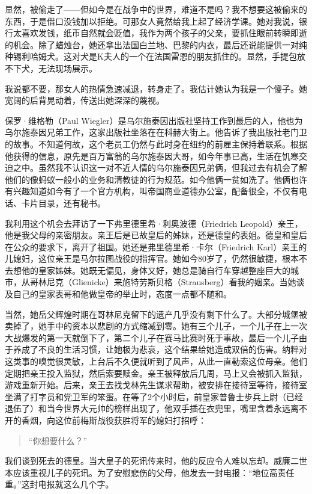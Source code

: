 \documentclass[UTF8]{ctexart}
\begin{document}
显然，被偷走了——但如今是在战争中的世界，难道不是吗？我不想要这被偷来的东西，于是借口没钱加以拒绝。可那女人竟然给我上起了经济学课。她对我说，银行太喜欢发钱，纸币自然就会贬值，我作为两个孩子的父亲，要抓住眼前转瞬即逝的机会。除了蜡烛台，她还拿出法国白兰地、巴黎的内衣，最后还说能提供一对纯种锡利哈姆犬。这对犬是K夫人的一个在法国雷恩的朋友抓住的。显然，手提包放不下犬，无法现场展示。

我说都不要，那女人的热情急速减退，转身走了。我估计她认为我是一个傻子。她宽阔的后背晃动着，传送出她深深的蔑视。

保罗·维格勒（Paul Wiegler）是乌尔施泰因出版社坚持工作到最后的人，他也为乌尔施泰因兄弟工作，这家出版社坐落在在科赫大街上。他告诉了我出版社老门卫的故事。不知道何故，这个老员工仍然与此时身在纽约的前雇主保持着联系。根据他获得的信息，原先是百万富翁的乌尔施泰因大哥，如今年事已高，生活在饥寒交迫之中。虽然我不认识这一对不近人情的乌尔施泰因兄弟俩，但我过去有机会了解他们的像蚂蚁一般小的业务和清教徒的行为规范。如今他俩一贫如洗了。他俩也许有兴趣知道如今有了一个官方机构，叫帝国商业道德办公室，配备很全，不仅有电话、卡片目录，还有秘书。

我利用这个机会去拜访了一下弗里德里希·利奥波德（Friedrich Leopold）亲王，他是我父母的亲密朋友。亲王后是已故皇后的姊妹，还是德皇的表姐。德皇和皇后在公众的要求下，离开了祖国。她还是弗里德里希·卡尔（Friedrich Karl）亲王的儿媳妇，这位亲王是马尔拉图战役的指挥官。她如今80岁了，仍然很敏捷，根本不去想他的皇家姊妹。她既无偏见，身体又好，她总是骑自行车穿越整座巨大的城市，从哥林尼克（Glienicke）来施特劳斯贝格（Strausberg）看我的姻亲。当她谈及自己的皇家表哥和他做皇帝的举止时，态度一点都不随和。

当然，她岳父辉煌时期在哥林尼克留下的遗产几乎没有剩下什么了。大部分城堡被卖掉了，她手中的资本以悲剧的方式缩减到零。她有三个儿子，一个儿子在上一次大战爆发的第一天就倒下了，第二个儿子在赛马比赛时死于事故，最后一个儿子由于养成了不良的生活习惯，让她极为悲哀，这个结果给她造成双倍的伤害。纳粹对这类事的嗅觉很灵敏，上台后不久便就听到了风声，从此一直勒索这位母亲。他们定期把亲王投入监狱，然后索要赎金。亲王被释放后几周，马上又会被抓入监狱，游戏重新开始。后来，亲王去找戈林先生谋求帮助，被安排在接待室等待，接待室坐满了打字员和党卫军的笨蛋。在等了2个小时后，前皇家普鲁士步兵上尉（已经退伍了）和当今世界大元帅的榜样出现了，他双手插在衣兜里，嘴里含着永远离不开的香烟，向这位前梅斯战役获胜将军的媳妇打招呼：
\begin{quote}
“你想要什么？”
\end{quote}
我们谈到死去的德皇。当大皇子的死讯传来时，他的反应令人难以忘却。威廉二世本应该重视儿子的死讯。为了安慰悲伤的父母，他发去一封电报：“地位高责任重。”这封电报就这么几个字。
\end{document}
